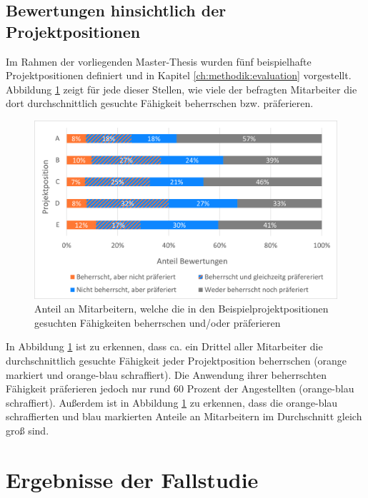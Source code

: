 \subsection{Bewertungen hinsichtlich der Projektpositionen}
\label{ch:ergebnisse:analyse:projektpositionen}
Im Rahmen der vorliegenden Master-Thesis wurden fünf beispielhafte Projektpositionen definiert und in Kapitel \ref{ch:methodik:evaluation} vorgestellt. Abbildung \ref{fig:ergebnisse:analyse:abb5} zeigt für jede dieser Stellen, wie viele der befragten Mitarbeiter die dort durchschnittlich gesuchte Fähigkeit beherrschen bzw. präferieren.

\begin{figure}[h]
	\centering
	\includegraphics[width=1\textwidth]{gfx/anteil-bewertungen-je-projektposition.png}
	\caption{Anteil an Mitarbeitern, welche die in den Beispielprojektpositionen gesuchten Fähigkeiten beherrschen und/oder präferieren}
	\label{fig:ergebnisse:analyse:abb5}
\end{figure}

In Abbildung \ref{fig:ergebnisse:analyse:abb5} ist zu erkennen, dass ca. ein Drittel aller Mitarbeiter die durchschnittlich gesuchte Fähigkeit jeder Projektposition beherrschen (orange markiert und orange-blau schraffiert). Die Anwendung ihrer beherrschten Fähigkeit präferieren jedoch nur rund 60 Prozent der Angestellten (orange-blau schraffiert). Außerdem ist in Abbildung \ref{fig:ergebnisse:analyse:abb5} zu erkennen, dass die orange-blau schraffierten und blau markierten Anteile an Mitarbeitern im Durchschnitt gleich groß sind.

\section{Ergebnisse der Fallstudie}
\label{ch:ergebnisse:fallstudie}

